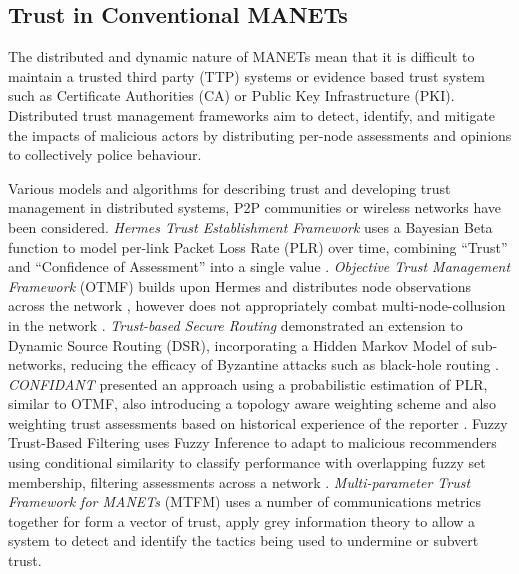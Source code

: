 \documentclass{aamas2016}
\begin{document}
\subsection{Trust in Conventional MANETs}
The distributed and dynamic nature of MANETs mean that it is difficult to maintain a trusted third party (TTP) systems or evidence based trust system such as Certificate Authorities (CA) or Public Key Infrastructure (PKI). 
Distributed trust management frameworks aim to detect, identify, and mitigate the impacts of malicious actors by distributing per-node assessments and opinions to collectively police behaviour. 

Various models and algorithms for describing trust and developing trust management in distributed systems, P2P communities or wireless networks have been considered.
\textit{Hermes Trust Establishment Framework} uses a Bayesian Beta function to model per-link Packet Loss Rate (PLR) over time, combining ``Trust'' and ``Confidence of Assessment'' into a single value \cite{Zouridaki2005}.
\textit{Objective Trust Management Framework} (OTMF) builds upon Hermes and distributes node observations across the network \cite{Li2008}, however does not appropriately combat multi-node-collusion in the network \cite{Cho2011}. 
\textit{Trust-based Secure Routing} demonstrated an extension to Dynamic Source Routing (DSR), incorporating a Hidden Markov Model of sub-networks, reducing the efficacy of Byzantine attacks such as black-hole routing  \cite{Moe2008a}. 
\textit{CONFIDANT} presented an approach using a probabilistic estimation of PLR, similar to OTMF, also introducing a topology aware weighting scheme and also weighting trust assessments based on historical experience of the reporter \cite{Buchegger2002}. Fuzzy Trust-Based Filtering uses Fuzzy Inference to adapt to malicious recommenders using conditional similarity to classify performance with overlapping fuzzy set membership, filtering assessments across a network \cite{Luo2008}.
\textit{Multi-parameter Trust Framework for MANETs} (MTFM) uses a number of communications metrics together for form a vector of trust, apply grey information theory to allow a system to detect and identify the tactics being used to undermine or subvert trust\cite{Guo11}.
\end{document}
